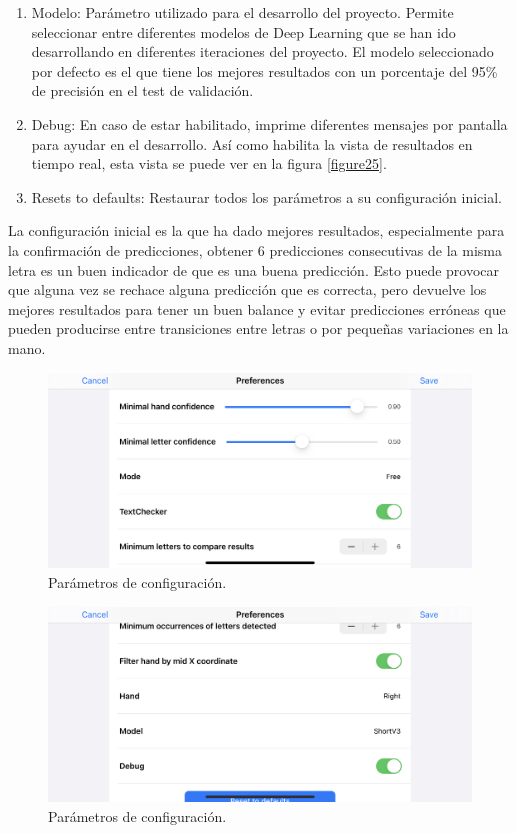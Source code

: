 \documentclass[../main.tex]{subfiles}
\begin{document}
\begin{enumerate}
    \item Modelo: Parámetro utilizado para el desarrollo del proyecto. Permite seleccionar entre diferentes modelos de Deep Learning que se han ido desarrollando en diferentes iteraciones del proyecto. El modelo seleccionado por defecto es el que tiene los mejores resultados con un porcentaje del 95\% de precisión en el test de validación.
    \item Debug: En caso de estar habilitado, imprime diferentes mensajes por pantalla para ayudar en el desarrollo. Así como habilita la vista de resultados en tiempo real, esta vista se puede ver en la figura \ref{figure25}.
    \item Resets to defaults: Restaurar todos los parámetros a su configuración inicial.
\end{enumerate}

La configuración inicial es la que ha dado mejores resultados, especialmente para la confirmación de predicciones, obtener 6 predicciones consecutivas de la misma letra es un buen indicador de que es una buena predicción. Esto puede provocar que alguna vez se rechace alguna predicción que es correcta, pero devuelve los mejores resultados para tener un buen balance y evitar predicciones erróneas que pueden producirse entre transiciones entre letras o por pequeñas variaciones en la mano.


\begin{figure}[h]
\centering 
\includegraphics[width=1\textwidth]{images/interpreter/config-scene1.PNG}
\caption{Parámetros de configuración.}
\label{figure28}
\end{figure}

\begin{figure}[h]
\centering 
\includegraphics[width=1\textwidth]{images/interpreter/config-scene2.PNG}
\caption{Parámetros de configuración.}
\label{figure29}
\end{figure}
\end{document}
